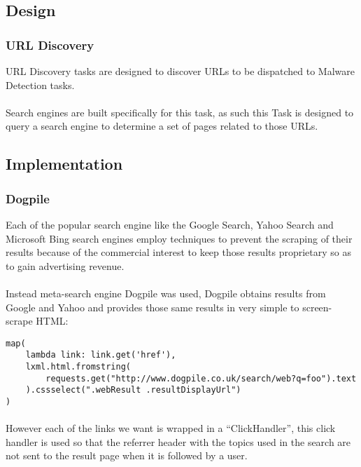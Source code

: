\subsection{Design}
\subsubsection{URL Discovery}
URL Discovery tasks are designed to discover URLs to be dispatched to Malware Detection tasks.

\paragraph{}
Search engines are built specifically for this task, as such this Task is designed to query a search engine to determine a set of pages related to those URLs.

\subsection{Implementation}
\subsubsection{Dogpile}
Each of the popular search engine like the Google Search, Yahoo Search and Microsoft Bing search engines employ techniques to prevent the scraping of their results because of the commercial interest to keep those results proprietary so as to gain advertising revenue.

\paragraph{}
Instead meta-search engine Dogpile was used, Dogpile obtains results from Google and Yahoo and provides those same results in very simple to screen-scrape HTML:

\begin{verbatim}
map(
    lambda link: link.get('href'),
    lxml.html.fromstring(
        requests.get("http://www.dogpile.co.uk/search/web?q=foo").text
    ).cssselect(".webResult .resultDisplayUrl")
)
\end{verbatim}

\paragraph{}
However each of the links we want is wrapped in a ``ClickHandler'', this click handler is used so that the referrer header with the topics used in the search are not sent to the result page when it is followed by a user.

